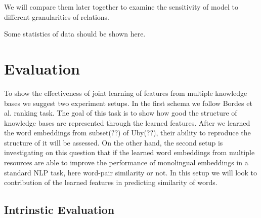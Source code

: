 \documentclass[11pt]{article}
\begin{document}
We will compare them later together to examine the sensitivity of model to
different granularities of relations. 

Some statistics of data should be shown here.





\section{Evaluation}
\label{sec:eval}

To show the effectiveness of joint learning of features from multiple knowledge bases we suggest 
two experiment setups. In the first schema we follow Bordes et al. ranking task. The goal of this task is
to show how good the structure of knowledge bases are represented through the learned features. 
After we learned the word embeddings from subset(??) of Uby(??),
their ability to reproduce the structure of it will be assessed. On the other hand, the second
setup is investigating on this question that if the learned word embeddings from multiple resources
are able to improve the performance of monolingual embeddings in a standard NLP
task, here word-pair similarity or not.
In this setup we will look to contribution of the learned features in predicting similarity of words.

\subsection{Intrinstic Evaluation}
\label{ssec:intrinsic}
\end{document}
